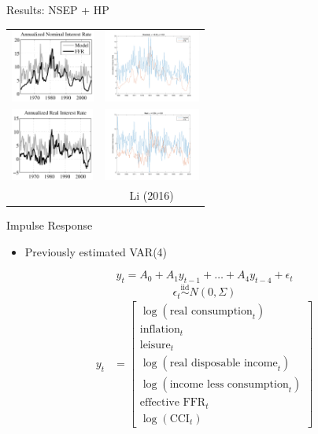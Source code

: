 \documentclass{beamer}
\begin{document}
\begin{frame}{Results: NSEP + HP}
\begin{center}
\begin{tabular}{cc}
\includegraphics[height=90px]{figs/implied_ffr/nominal_4_collard.png} &
\includegraphics[height=90px]{figs/implied_ffr/nominal_4.png} \\
\includegraphics[height=90px]{figs/implied_ffr/real_4_collard.png} &
\includegraphics[height=90px]{figs/implied_ffr/real_4.png} \\
\cite{collard11} & Li (2016)
\end{tabular}
\end{center}
\end{frame}

\begin{frame}{Impulse Response}
\begin{itemize}
\item Previously estimated VAR(4)
\end{itemize}
$$y_t = A_0 + A_1 y_{t-1} + \ldots + A_4 y_{t-4} + \epsilon_t$$
$$\epsilon_t \overset{\text{iid}}{\sim} N(0, \Sigma)$$
\begin{align*}
y_t &= \begin{bmatrix} \log(\text{real consumption}_t) \\ \text{inflation}_t \\ \text{leisure}_t \\ \log(\text{real disposable income}_t) \\ \log(\text{income less consumption}_t) \\ \text{effective FFR}_t \\ \log(\text{CCI}_t) \end{bmatrix}
\end{align*}
\end{frame}
\end{document}

